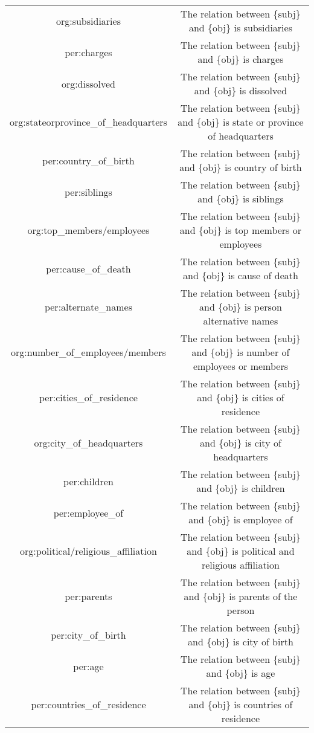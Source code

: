 \begin{table*}[h]
\begin{threeparttable}
\begin{tabular}{cc}
    org:subsidiaries &     The relation between \{subj\} and \{obj\} is subsidiaries\\
    per:charges &     The relation between \{subj\} and \{obj\} is charges\\
    org:dissolved &     The relation between \{subj\} and \{obj\} is dissolved\\
    org:stateorprovince\_of\_headquarters &     The relation between \{subj\} and \{obj\} is state or province of headquarters\\
    per:country\_of\_birth &     The relation between \{subj\} and \{obj\} is country of birth\\
    per:siblings &     The relation between \{subj\} and \{obj\} is siblings\\
    org:top\_members/employees &     The relation between \{subj\} and \{obj\} is top members or employees\\
    per:cause\_of\_death &     The relation between \{subj\} and \{obj\} is cause of death\\
    per:alternate\_names &     The relation between \{subj\} and \{obj\} is person alternative names\\
    org:number\_of\_employees/members &     The relation between \{subj\} and \{obj\} is number of employees or members\\
    per:cities\_of\_residence &     The relation between \{subj\} and \{obj\} is cities of residence\\
    org:city\_of\_headquarters &     The relation between \{subj\} and \{obj\} is city of headquarters\\
    per:children &     The relation between \{subj\} and \{obj\} is children\\
    per:employee\_of &     The relation between \{subj\} and \{obj\} is employee of\\
    org:political/religious\_affiliation &     The relation between \{subj\} and \{obj\} is political and religious affiliation\\
    per:parents &     The relation between \{subj\} and \{obj\} is parents of the person\\
    per:city\_of\_birth &     The relation between \{subj\} and \{obj\} is city of birth\\
    per:age &     The relation between \{subj\} and \{obj\} is age\\
    per:countries\_of\_residence &     The relation between \{subj\} and \{obj\} is countries of residence\\

\end{tabular}
\end{threeparttable}
\end{table*}
